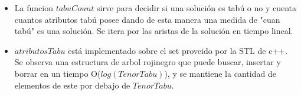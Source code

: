 \begin{itemize}
\item La funcion $tabuCount$ sirve para decidir si una solución es tabú o no y cuenta cuantos atributos tabú posee dando de esta manera una medida de "cuan tabú" es una solución. Se itera por las aristas de la solución en tiempo lineal.
\item $atributosTabu$ está implementado sobre el set proveido por la STL de c++. Se observa una estructura de arbol rojinegro que puede buscar, insertar y borrar en un tiempo O($log(TenorTabu)$), y se mantiene la cantidad de elementos de este por debajo de $TenorTabu$.
\end{itemize}

